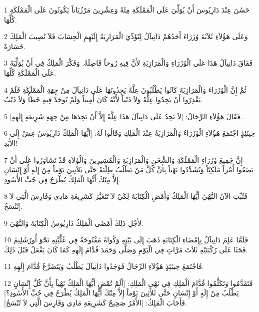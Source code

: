 \par 1 حَسُنَ عِنْدَ دَارِيُوسَ أَنْ يُوَلِّيَ عَلَى الْمَمْلَكَةِ مِئَةً وَعِشْرِينَ مَرْزُبَاناً يَكُونُونَ عَلَى الْمَمْلَكَةِ كُلِّهَا.
\par 2 وَعَلَى هَؤُلاَءِ ثَلاَثَةَ وُزَرَاءَ أَحَدُهُمْ دَانِيآلُ لِتُؤَدِّيَ الْمَرَازِبَةُ إِلَيْهِمِ الْحِسَابَ فَلاَ تُصِيبَ الْمَلِكَ خَسَارَةٌ.
\par 3 فَفَاقَ دَانِيآلُ هَذَا عَلَى الْوُزَرَاءِ وَالْمَرَازِبَةِ لأَنَّ فِيهِ رُوحاً فَاضِلَةً. وَفَكَّرَ الْمَلِكُ فِي أَنْ يُوَلِّيَهُ عَلَى الْمَمْلَكَةِ كُلِّهَا.
\par 4 ثُمَّ إِنَّ الْوُزَرَاءَ وَالْمَرَازِبَةَ كَانُوا يَطْلُبُونَ عِلَّةً يَجِدُونَهَا عَلَى دَانِيآلَ مِنْ جِهَةِ الْمَمْلَكَةِ فَلَمْ يَقْدِرُوا أَنْ يَجِدُوا عِلَّةً وَلاَ ذَنْباً لأَنَّهُ كَانَ أَمِيناً وَلَمْ يُوجَدْ فِيهِ خَطَأٌ وَلاَ ذَنْبٌ.
\par 5 فَقَالَ هَؤُلاَءِ الرِّجَالُ: [لاَ نَجِدُ عَلَى دَانِيآلَ هَذَا عِلَّةً إِلاَّ أَنْ نَجِدَهَا مِنْ جِهَةِ شَرِيعَةِ إِلَهِهِ].
\par 6 حِينَئِذٍ اجْتَمَعَ هَؤُلاَءِ الْوُزَرَاءُ وَالْمَرَازِبَةُ عِنْدَ الْمَلِكِ وَقَالُوا لَهُ: [أَيُّهَا الْمَلِكُ دَارِيُوسُ عِشْ إِلَى الأَبَدِ!
\par 7 إِنَّ جَمِيعَ وُزَرَاءِ الْمَمْلَكَةِ وَالشِّحَنِ وَالْمَرَازِبَةِ وَالْمُشِيرِينَ وَالْوُلاَةِ قَدْ تَشَاوَرُوا عَلَى أَنْ يَضَعُوا أَمْراً مَلَكِيّاً وَيُشَدِّدُوا نَهْياً بِأَنَّ كُلَّ مَنْ يَطْلُبُ طِلْبَةً حَتَّى ثَلاَثِينَ يَوْماً مِنْ إِلَهٍ أَوْ إِنْسَانٍ إِلاَّ مِنْكَ أَيُّهَا الْمَلِكُ يُطْرَحُ فِي جُبِّ الأُسُودِ.
\par 8 فَثَبِّتِ الآنَ النَّهْيَ أَيُّهَا الْمَلِكُ وَأَمْضِ الْكِتَابَةَ لِكَيْ لاَ تَتَغَيَّرَ كَشَرِيعَةِ مَادِي وَفَارِسَ الَّتِي لاَ تُنْسَخُ].
\par 9 لأَجْلِ ذَلِكَ أَمْضَى الْمَلِكُ دَارِيُوسُ الْكِتَابَةَ وَالنَّهْيَ.
\par 10 فَلَمَّا عَلِمَ دَانِيآلُ بِإِمْضَاءِ الْكِتَابَةِ ذَهَبَ إِلَى بَيْتِهِ وَكُواهُ مَفْتُوحَةٌ فِي عُلِّيَّتِهِ نَحْوَ أُورُشَلِيمَ فَجَثَا عَلَى رُكْبَتَيْهِ ثَلاَثَ مَرَّاتٍ فِي الْيَوْمِ وَصَلَّى وَحَمَدَ قُدَّامَ إِلَهِهِ كَمَا كَانَ يَفْعَلُ قَبْلَ ذَلِكَ.
\par 11 فَاجْتَمَعَ حِينَئِذٍ هَؤُلاَءِ الرِّجَالُ فَوَجَدُوا دَانِيآلَ يَطْلُبُ وَيَتَضَرَّعُ قُدَّامَ إِلَهِهِ.
\par 12 فَتَقَدَّمُوا وَتَكَلَّمُوا قُدَّامَ الْمَلِكِ فِي نَهْيِ الْمَلِكِ: [أَلَمْ تُمْضِ أَيُّهَا الْمَلِكُ نَهْياً بِأَنَّ كُلَّ إِنْسَانٍ يَطْلُبُ مِنْ إِلَهٍ أَوْ إِنْسَانٍ حَتَّى ثَلاَثِينَ يَوْماً إِلاَّ مِنْكَ أَيُّهَا الْمَلِكُ يُطْرَحُ فِي جُبِّ الأُسُودِ؟] فَأَجَابَ الْمَلِكُ: [الأَمْرُ صَحِيحٌ كَشَرِيعَةِ مَادِي وَفَارِسَ الَّتِي لاَ تُنْسَخُ].
